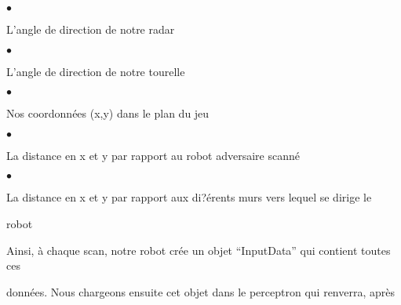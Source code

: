 \documentclass[a4paper,portrait,12pt]{article}
\begin{document}
$\bullet$





\begin{flushleft}
L'angle de direction de notre radar
\end{flushleft}





$\bullet$





\begin{flushleft}
L'angle de direction de notre tourelle
\end{flushleft}





$\bullet$





\begin{flushleft}
Nos coordonn\'{e}es (x,y) dans le plan du jeu
\end{flushleft}





$\bullet$





\begin{flushleft}
La distance en x et y par rapport au robot adversaire scann\'{e}
\end{flushleft}





$\bullet$





\begin{flushleft}
La distance en x et y par rapport aux di?\'{e}rents murs vers lequel se dirige le
\end{flushleft}


\begin{flushleft}
robot
\end{flushleft}





\begin{flushleft}
Ainsi, \`{a} chaque scan, notre robot cr\'{e}e un objet {``}InputData'' qui contient toutes ces
\end{flushleft}


\begin{flushleft}
donn\'{e}es. Nous chargeons ensuite cet objet dans le perceptron qui renverra, apr\`{e}s
\end{flushleft}
\end{document}
